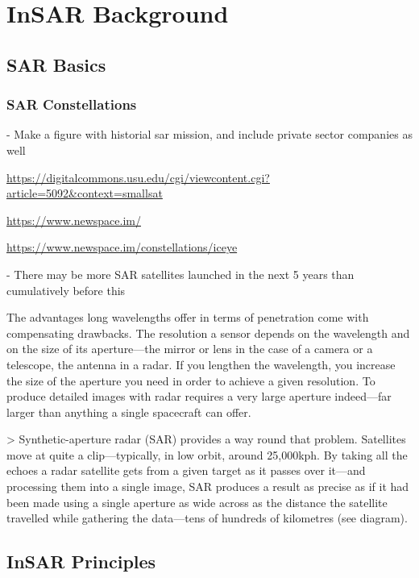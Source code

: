 \documentclass{utexasthesis}
\begin{document}
\chapter{InSAR Background}
\label{chap3}


\section{SAR Basics}
\label{chap3-sar}

\subsection{SAR Constellations}

- Make a figure with historial sar mission, and include private sector companies as well

\url{https://digitalcommons.usu.edu/cgi/viewcontent.cgi?article=5092&context=smallsat}

\url{https://www.newspace.im/ }

\url{https://www.newspace.im/constellations/iceye}


- There may be more SAR satellites launched in the next 5 years than cumulatively before this



The advantages long wavelengths offer in terms of penetration come with compensating drawbacks. The resolution a sensor depends on the wavelength and on the size of its aperture—the mirror or lens in the case of a camera or a telescope, the antenna in a radar. If you lengthen the wavelength, you increase the size of the aperture you need in order to achieve a given resolution. To produce detailed images with radar requires a very large aperture indeed—far larger than anything a single spacecraft can offer.

> Synthetic-aperture radar (SAR) provides a way round that problem. Satellites move at quite a clip—typically, in low orbit, around 25,000kph. By taking all the echoes a radar satellite gets from a given target as it passes over it—and processing them into a single image, SAR produces a result as precise as if it had been made using a single aperture as wide across as the distance the satellite travelled while gathering the data—tens of hundreds of kilometres (see diagram).

\section{InSAR Principles}
\end{document}
